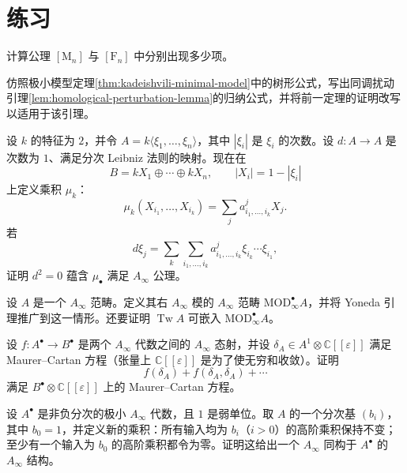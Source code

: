 \section{练习}\label{sec:chapter3-exercises}
\begin{exercise}\label{exer:ainfty-term-count}
计算公理 $[\mathrm M_n]$ 与 $[\mathrm F_n]$ 中分别出现多少项。
\end{exercise}

\begin{exercise}\label{exer:homological-perturbation-trees}
仿照极小模型定理\ref{thm:kadeishvili-minimal-model}中的树形公式，写出同调扰动引理\ref{lem:homological-perturbation-lemma}的归纳公式，并将前一定理的证明改写以适用于该引理。
\end{exercise}

\begin{exercise}\label{exer:char2-ainfty-from-differential}
设 $k$ 的特征为 $2$，并令 $A=k\langle\xi_1,\ldots,\xi_n\rangle$，其中 $|\xi_i|$ 是 $\xi_i$ 的次数。设 $d\colon A\to A$ 是次数为 $1$、满足分次 Leibniz 法则的映射。现在在
\[
  B=kX_1\oplus\cdots\oplus kX_n,\qquad |X_i|=1-|\xi_i|
\]
上定义乘积 $\mu_k$：
\[
  \mu_k(X_{i_1},\ldots,X_{i_k})=\sum_j a^j_{i_1,\ldots,i_k}X_j.
\]
若
\[
  d\xi_j=\sum_k\sum_{i_1,\ldots,i_k}
  a^j_{i_1,\ldots,i_k}\xi_{i_k}\cdots\xi_{i_1},
\]
证明 $d^2=0$ 蕴含 $\mu_\bullet$ 满足 $A_\infty$ 公理。
\end{exercise}

\begin{exercise}\label{exer:ainfty-modules-yoneda}
设 $A$ 是一个 $A_\infty$ 范畴。定义其右 $A_\infty$ 模的 $A_\infty$ 范畴 $\mathrm{MOD}^\bullet_\infty A$，并将 Yoneda 引理推广到这一情形。还要证明 $\operatorname{Tw}A$ 可嵌入 $\mathrm{MOD}^\bullet_\infty A$。
\end{exercise}

\begin{exercise}\label{exer:ainfty-morphism-maurer-cartan}
设 $f\colon A^\bullet\to B^\bullet$ 是两个 $A_\infty$ 代数之间的 $A_\infty$ 态射，并设 $\delta_A\in A^1\otimes\mathbb C[[\varepsilon]]$ 满足 Maurer–Cartan 方程（张量上 $\mathbb C[[\varepsilon]]$ 是为了使无穷和收敛）。证明
\[
  f(\delta_A)+f(\delta_A,\delta_A)+\cdots
\]
满足 $B^\bullet\otimes\mathbb C[[\varepsilon]]$ 上的 Maurer–Cartan 方程。
\end{exercise}

\begin{exercise}\label{exer:weak-unit-strictification}
设 $A^\bullet$ 是非负分次的极小 $A_\infty$ 代数，且 $1$ 是弱单位。取 $A$ 的一个分次基 $(b_i)$，其中 $b_0=1$，并定义新的乘积：所有输入均为 $b_i$（$i>0$）的高阶乘积保持不变；至少有一个输入为 $b_0$ 的高阶乘积都令为零。证明这给出一个 $A_\infty$ 同构于 $A^\bullet$ 的 $A_\infty$ 结构。
\end{exercise}

